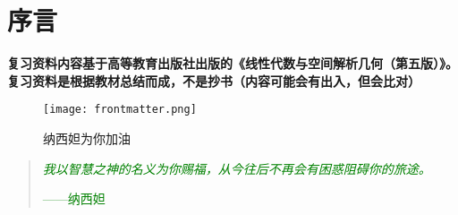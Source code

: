 \maketitle
\chapter*{序言}
\begin{note}
	{\textbf{复习资料内容基于高等教育出版社出版的《线性代数与空间解析几何（第五版）》。复习资料是根据教材总结而成，不是抄书（内容可能会有出入，但会比对）}}
\end{note}
	\vspace*{15ex}
\begin{figure}[H]
	\centering
	\texttt{[image: frontmatter.png]}
	\caption*{纳西妲为你加油}
\end{figure}
\begin{quote}
	\textcolor{green}{\textit{我以智慧之神的名义为你赐福，从今往后不再会有困惑阻碍你的旅途。}}
	\begin{flushright}
			\textcolor{green}{——纳西妲}
	\end{flushright}
\end{quote}
\mytableofcontents